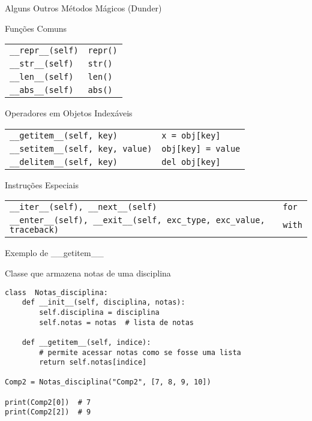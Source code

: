 \begin{frame}{Alguns Outros Métodos Mágicos (Dunder)}

\begin{block}{Funções Comuns}
\begin{tabular}{ll}
\texttt{\_\_repr\_\_(self)} & \texttt{repr()} \\
\texttt{\_\_str\_\_(self)} & \texttt{str()} \\
\texttt{\_\_len\_\_(self)} & \texttt{len()} \\
\texttt{\_\_abs\_\_(self)} & \texttt{abs()} \\
\end{tabular}
\end{block}

\begin{block}{Operadores em Objetos Indexáveis}
\begin{tabular}{ll}
\texttt{\_\_getitem\_\_(self, key)} & \texttt{x = obj[key]} \\
\texttt{\_\_setitem\_\_(self, key, value)} & \texttt{obj[key] = value} \\
\texttt{\_\_delitem\_\_(self, key)} & \texttt{del obj[key]} \\
\end{tabular}
\end{block}

\begin{block}{Instruções Especiais}
\begin{tabular}{ll}
\texttt{\_\_iter\_\_(self), \_\_next\_\_(self)} & \texttt{for} \\
\texttt{\_\_enter\_\_(self), \_\_exit\_\_(self, exc\_type, exc\_value, traceback)} & \texttt{with} \\
\end{tabular}
\end{block}

\end{frame}

\begin{frame}[fragile]{Exemplo de \_\_getitem\_\_}

\begin{exampleblock}{Classe que armazena notas de uma disciplina}
\begin{verbatim}
class  Notas_disciplina:
    def __init__(self, disciplina, notas):
        self.disciplina = disciplina
        self.notas = notas  # lista de notas

    def __getitem__(self, indice):
        # permite acessar notas como se fosse uma lista
        return self.notas[indice]

Comp2 = Notas_disciplina("Comp2", [7, 8, 9, 10])

print(Comp2[0])  # 7
print(Comp2[2])  # 9
\end{verbatim}
\end{exampleblock}




\end{frame}

